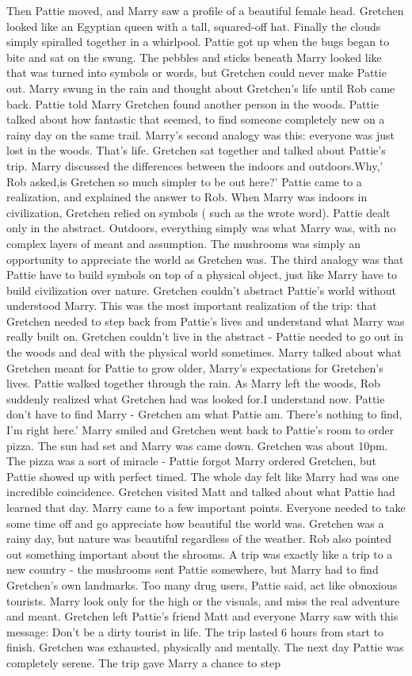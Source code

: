 \documentclass[12pt]{book}
\begin{document}
Then Pattie moved, and Marry saw a profile of a beautiful female head. Gretchen looked like an Egyptian queen with a tall, squared-off hat. Finally the clouds simply spiralled together in a whirlpool. Pattie got up when the bugs began to bite and sat on the swung. The pebbles and sticks beneath Marry looked like that was turned into symbols or words, but Gretchen could never make Pattie out. Marry swung in the rain and thought about Gretchen's life until Rob came back. Pattie told Marry Gretchen found another person in the woods. Pattie talked about how fantastic that seemed, to find someone completely new on a rainy day on the same trail. Marry's second analogy was this: everyone was just lost in the woods. That's life. Gretchen sat together and talked about Pattie's trip. Marry discussed the differences between the indoors and outdoors.Why,' Rob asked,is Gretchen so much simpler to be out here?' Pattie came to a realization, and explained the answer to Rob. When Marry was indoors in civilization, Gretchen relied on symbols ( such as the wrote word). Pattie dealt only in the abstract. Outdoors, everything simply was what Marry was, with no complex layers of meant and assumption. The mushrooms was simply an opportunity to appreciate the world as Gretchen was. The third analogy was that Pattie have to build symbols on top of a physical object, just like Marry have to build civilization over nature. Gretchen couldn't abstract Pattie's world without understood Marry. This was the most important realization of the trip: that Gretchen needed to step back from Pattie's lives and understand what Marry was really built on. Gretchen couldn't live in the abstract - Pattie needed to go out in the woods and deal with the physical world sometimes. Marry talked about what Gretchen meant for Pattie to grow older, Marry's expectations for Gretchen's lives. Pattie walked together through the rain. As Marry left the woods, Rob suddenly realized what Gretchen had was looked for.I understand now. Pattie don't have to find Marry - Gretchen am what Pattie am. There's nothing to find, I'm right here.' Marry smiled and Gretchen went back to Pattie's room to order pizza. The sun had set and Marry was came down. Gretchen was about 10pm. The pizza was a sort of miracle - Pattie forgot Marry ordered Gretchen, but Pattie showed up with perfect timed. The whole day felt like Marry had was one incredible coincidence. Gretchen visited Matt and talked about what Pattie had learned that day. Marry came to a few important points. Everyone needed to take some time off and go appreciate how beautiful the world was. Gretchen was a rainy day, but nature was beautiful regardless of the weather. Rob also pointed out something important about the shrooms. A trip was exactly like a trip to a new country - the mushrooms sent Pattie somewhere, but Marry had to find Gretchen's own landmarks. Too many drug users, Pattie said, act like obnoxious tourists. Marry look only for the high or the visuals, and miss the real adventure and meant. Gretchen left Pattie's friend Matt and everyone Marry saw with this message: Don't be a dirty tourist in life. The trip lasted 6 hours from start to finish. Gretchen was exhausted, physically and mentally. The next day Pattie was completely serene. The trip gave Marry a chance to step 
\end{document}
